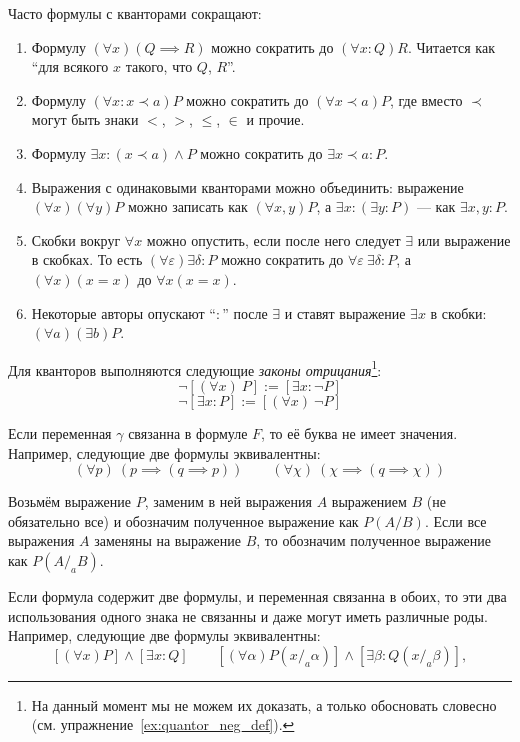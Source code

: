Часто формулы с кванторами сокращают:
\begin{enumerate}
	\item{}Формулу ${(\forall x)(Q\implies R)}$ можно сократить
	до ${(\forall x:Q)R}$. Читается как ``для всякого $x$ такого, что
	$Q$, $R$''.

	\item{}Формулу $(\forall x:x\prec a)P$ можно сократить до $(\forall x\prec a)P$,
	где вместо $\prec$ могут быть знаки $<$, $>$, $\leq$, $\in$ и прочие.

	\item{}Формулу $\exists x:(x\prec a)\land P$ можно сократить
	до $\exists x\prec a:P$.

	\item{}Выражения с одинаковыми кванторами можно объединить:
	выражение $(\forall x)(\forall y)P$ можно записать как $(\forall x,y)P$,
	а ${\exists x:(\exists y:P)}$ --- как $\exists x,y:P$.

	\item{}Скобки вокруг $\forall x$ можно опустить, если после него следует $\exists$ или
	выражение в скобках.
	То есть ${(\forall \varepsilon)\exists \delta:P}$
	можно сократить до $\forall \varepsilon~\exists \delta:P$,
	а $(\forall x)(x=x)$ до $\forall x(x=x)$.

	\item{}Некоторые авторы опускают ``$:$'' после $\exists$ и
	ставят выражение $\exists x$ в скобки: $(\forall a)(\exists b)P$.
\end{enumerate}

Для кванторов выполняются следующие {\it законы отрицания}\footnote{
	На данный момент мы не можем их доказать, а только
	обосновать словесно (см. упражнение~\ref{ex:quantor_neg_def}).
}:
\[
	\lnot[(\forall x)~P]:=[\exists x:\lnot P]
\]
\[
	\lnot[\exists x:P]:=[(\forall x)~\lnot P]
\]

Если переменная $\gamma$ связанна в формуле $F$, то её буква не имеет значения.
Например, следующие две формулы эквивалентны:
\[
	(\forall p)~(p\implies (q\implies p))\qquad
	(\forall \chi)~(\chi\implies (q\implies\chi))
\]

Возьмём выражение $P$, заменим в ней выражения $A$ выражением $B$ (не обязательно все)
и обозначим полученное выражение как $P(A/B)$. Если все выражения $A$ заменяны
на выражение $B$, то обозначим полученное выражение как $P(A/_{a}B)$.

Если формула содержит две формулы, и переменная
связанна в обоих, то эти два использования
одного знака не связанны и даже могут иметь различные роды.
Например, следующие две формулы эквивалентны:
\[
	[(\forall x)P]\land[\exists x:Q]\qquad
	[(\forall \alpha)P(x/_{a}\alpha)]\land[\exists \beta:Q(x/_{a}\beta)],
\]

